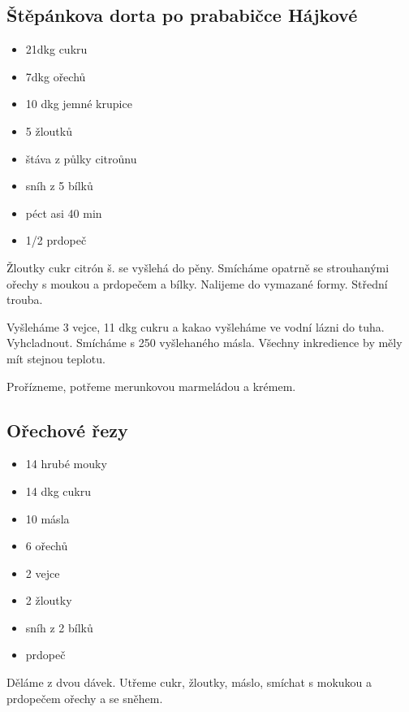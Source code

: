 \documentclass[10pt,a4paper]{article}
\newenvironment{myitemize}
{ \begin{itemize}
    \setlength{\itemsep}{0pt}
    \setlength{\parskip}{0pt}
    \setlength{\parsep}{0pt}     }
{ \end{itemize}                  }
\begin{document}
\subsection{Štěpánkova dorta po prababičce Hájkové}
\begin{minipage}[t]{0,5\textwidth}
\begin{myitemize} 
\item 21dkg cukru
\item 7dkg ořechů
\item 10 dkg jemné krupice 
\item 5 žloutků
\item štáva z půlky citroůnu
\item sníh z 5 bílků
\item péct asi 40 min
\item 1/2 prdopeč
\end{myitemize}
\end{minipage}
\begin{minipage}[t]{0,5\textwidth}
Žloutky cukr citrón š. se vyšlehá do pěny. Smícháme opatrně se strouhanými ořechy s moukou a prdopečem a bílky. Nalijeme do vymazané formy. Střední trouba.

Vyšleháme 3 vejce, 11 dkg cukru a kakao vyšleháme ve vodní lázni do tuha. Vyhcladnout. Smícháme s 250 vyšlehaného másla. Všechny inkredience by měly mít stejnou teplotu.

Prořízneme, potřeme merunkovou marmeládou a krémem.
\end{minipage}
\subsection{Ořechové řezy}
\begin{minipage}[t]{0,5\textwidth}
\begin{myitemize} 
\item 14 hrubé mouky
\item 14 dkg cukru
\item 10 másla
\item 6 ořechů
\item 2 vejce
\item 2 žloutky
\item sníh z 2 bílků
\item prdopeč
\end{myitemize}
\end{minipage}
\begin{minipage}[t]{0,5\textwidth}
Děláme z dvou dávek. Utřeme cukr, žloutky, máslo, smíchat s mokukou a prdopečem ořechy a se sněhem.
\end{minipage}
\end{document}
